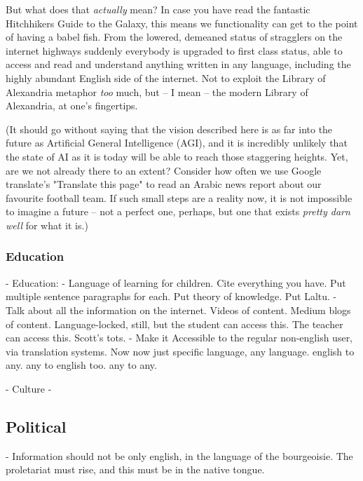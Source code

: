 \documentclass[11pt]{article}
\begin{document}
But what does that \textit{actually} mean? In case you have read the fantastic
Hitchhikers Guide to the Galaxy, this means we functionality can get to the
point of having a babel fish. From the lowered, demeaned status of stragglers on
the internet highways suddenly everybody is upgraded to first class status, able
to access and read and understand anything written in any language, including
the highly abundant English side of the internet. Not to exploit the Library of
Alexandria metaphor \textit{too} much, but -- I mean -- the modern Library of
Alexandria, at one's fingertips.

(It should go without saying that the vision described here is as far into the
future as Artificial General Intelligence (AGI), and it is incredibly unlikely
that the state of AI as it is today will be able to reach those staggering
heights. Yet, are we not already there to an extent? Consider how often we use
Google translate's "Translate this page" to read an Arabic news report about our
favourite football team. If such small steps are a reality now, it is not
impossible to imagine a future -- not a perfect one, perhaps, but one that
exists \textit{pretty darn well} for what it is.)

\subsubsection{Education}
 
- Education:
    - Language of learning for children. Cite everything you have. 
    \cite{cummins_bilingualism_1981} \cite{hudelson_role_1987}
    \cite{hakuta_compendium_1986} Put multiple 
    sentence paragraphs for each. Put theory of knowledge. Put Laltu.
    \cite{noauthor_knowledge_2020}
    - Talk about all the information on the internet. Videos of content. Medium
    blogs of content. Language-locked, still, but the student can access this.
    The teacher can access this. Scott's tots.
    - Make it Accessible to the regular non-english user, via translation
    systems. Now now just specific language, any language. english to any. any
    to english too. any to any.

- Culture
    - \cite{geser_digicult_2002}

\subsection{Political}

- Information should not be only english, in the language of the bourgeoisie.
The proletariat must rise, and this must be in the native tongue.
\end{document}

